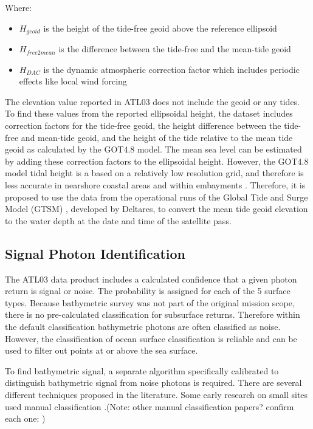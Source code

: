 Where:
\begin{itemize}
      \item $H_{geoid}$ is the height of the tide-free geoid above the reference ellipsoid
      \item $H_{free2mean}$ is the difference between the tide-free and the mean-tide geoid
      \item $H_{DAC}$ is the dynamic atmospheric correction factor which includes periodic effects like local wind forcing
\end{itemize}

The elevation value reported in ATL03 does not include the geoid or any tides. To find these values from the reported ellipsoidal height, the dataset includes correction factors for the tide-free geoid, the height difference between the tide-free and mean-tide geoid, and the height of the tide relative to the mean tide geoid as calculated by the GOT4.8 model. The mean sea level can be estimated by adding these correction factors to the ellipsoidal height. However, the GOT4.8 model tidal height is a based on a relatively low resolution grid, and therefore is less accurate in nearshore coastal areas and within embayments \parencite{Neumann2019e}. Therefore, it is proposed to use the data from the operational runs of the Global Tide and Surge Model (GTSM) \parencite{Buckman2015}, developed by Deltares, to convert the mean tide geoid elevation to the water depth at the date and time of the satellite pass.

\subsection{Signal Photon Identification}
\label{subsec:denoising}
The ATL03 data product includes a calculated confidence that a given photon return is signal or noise. The probability is assigned for each of the 5 surface types. Because bathymetric survey was not part of the original mission scope, there is no pre-calculated classification for subsurface returns. Therefore within the default classification bathymetric photons are often classified as noise. However, the classification of ocean surface classification is reliable \parencite{}  and can be used to filter out points at or above the sea surface.

To find bathymetric signal, a separate algorithm specifically calibrated to distinguish bathymetric signal from noise photons is required. There are several different techniques proposed in the literature. Some early research on small sites used manual classification \parencite{Forfinski-Sarkozi2016}.(Note: other manual classification papers? confirm each one:
\cite{Thomas2021d}
\cite{Babbel2021a}
\cite{Albright2021})


